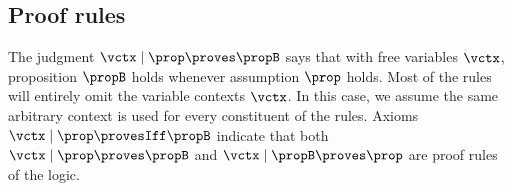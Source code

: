 
\subsection{Proof rules}
\label{sec:proof-rules}

The judgment $\vctx \mid \prop \proves \propB$ says that with free variables $\vctx$, proposition $\propB$ holds whenever assumption $\prop$ holds.
Most of the rules will entirely omit the variable contexts $\vctx$.
In this case, we assume the same arbitrary context is used for every constituent of the rules.
Axioms $\vctx \mid \prop \provesIff \propB$ indicate that both $\vctx \mid \prop \proves \propB$ and $\vctx \mid \propB \proves \prop$ are proof rules of the logic.

\judgment{\vctx \mid \prop \proves \propB}
